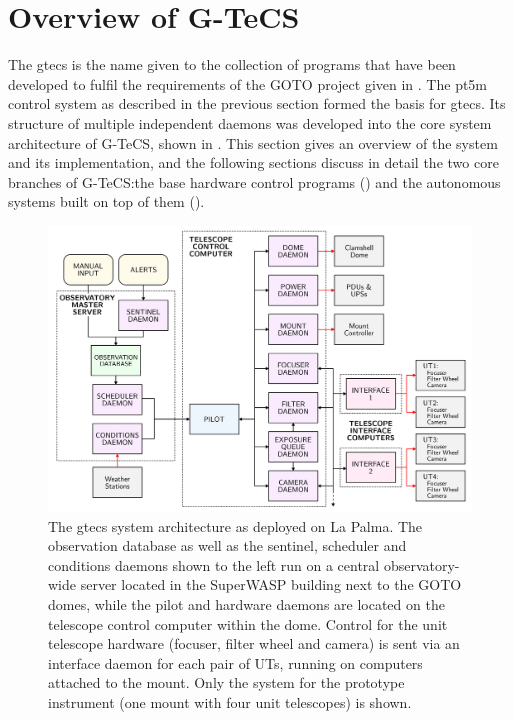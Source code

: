 \section{Overview of G-TeCS}
\label{sec:gtecs}
\begin{colsection}


\begin{colsection}


The \gls{gtecs} is the name given to the collection of programs that have been developed to fulfil the requirements of the GOTO project given in . The \gls{pt5m} control system as described in the previous section formed the basis for \gls{gtecs}. Its structure of multiple independent daemons was developed into the core system architecture of G-TeCS, shown in . This section gives an overview of the system and its implementation, and the following sections discuss in detail the two core branches of G-TeCS:\@ the base hardware control programs () and the autonomous systems built on top of them ().

\begin{figure}[p]
    \begin{center}
        \includegraphics[width=\linewidth]{images/flow.pdf}
    \end{center}
    \caption[The G-TeCS system architecture]{
        The \gls{gtecs} system architecture as deployed on La Palma. The observation database as well as the sentinel, scheduler and conditions daemons shown to the left run on a central observatory-wide server located in the SuperWASP building next to the GOTO domes, while the pilot and hardware daemons are located on the telescope control computer within the dome. Control for the unit telescope hardware (focuser, filter wheel and camera) is sent via an interface daemon for each pair of UTs, running on computers attached to the mount. Only the system for the prototype instrument (one mount with four unit telescopes) is shown.
    }\label{fig:flow}
\end{figure}


\end{colsection}
\end{colsection}
